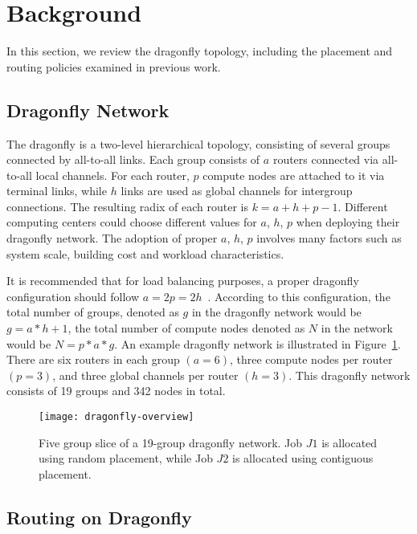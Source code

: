 
\section{Background}
\label{sec:background}

In this section, we review the dragonfly topology, including the placement and routing policies examined in previous work. 

\subsection{Dragonfly Network}
\label{sec:network}
The dragonfly is a two-level hierarchical topology, consisting of several groups connected by all-to-all links. Each group consists of $a$ routers connected via all-to-all local channels. For each router, $p$ compute nodes are attached to it via terminal links, while $h$ links are used as global channels for intergroup connections. The resulting radix of each router is $k = a+h+p-1$. Different computing centers could choose different values for  $a$, $h$, $p$ when deploying their dragonfly network. The adoption of proper $a$, $h$, $p$ involves many factors such as system scale, building cost and workload characteristics. 

It is recommended that for load balancing purposes, a proper dragonfly configuration should follow $a=2p=2h$~\cite{kim-micro}. According to this configuration, the total number of groups, denoted as $g$ in the dragonfly network would be $g = a*h+1 $, the total number of compute nodes denoted as $N$ in the network would be $N = p*a*g $. An example dragonfly network is illustrated in Figure~\ref{fig:dragonfly-overview}. There are six routers in each group $(a=6)$, three compute nodes per router $(p=3)$, and three global channels per router $(h=3)$. This dragonfly network consists of 19 groups and 342 nodes in total.

\begin{figure}[h!] 
  \centering
  \texttt{[image: dragonfly-overview]}
  \caption{Five group slice of a 19-group dragonfly network. Job $J1$ is allocated using random placement, while Job $J2$ is allocated using contiguous placement.}
  \label{fig:dragonfly-overview}
\end{figure}


\subsection{Routing on Dragonfly}
\label{sec:routing-schemes}

